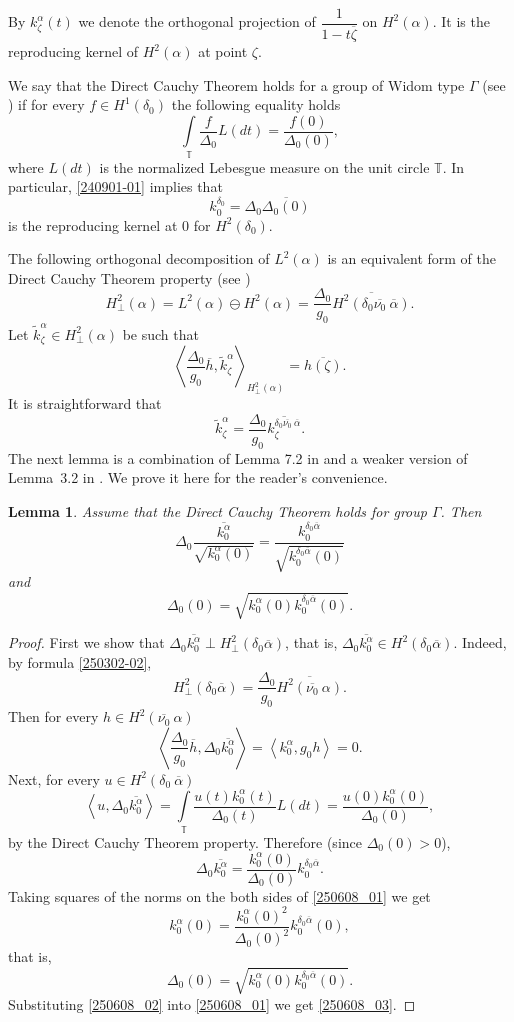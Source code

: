 \documentclass[reqno,11pt,centertags]{article}
\newcommand{\bbT}{{\mathbb{T}}}
\newcommand{\z}{\zeta}
\newtheorem{lemma}[theorem]{Lemma}
\theoremstyle{definition}
\def\be{\begin{equation}}
\def\ee{\end{equation}}
\def\a{\alpha}
\def\d{\delta}
\def\D{\Delta}
\def\G{\Gamma}
\def\z{\zeta}
\begin{document}
By $k^\a_\z(t)$ we denote the orthogonal projection of $\dfrac{1}{1-t\overline\z}$ on $H^2(\a)$. It is the reproducing kernel of $H^2(\a)$ at point $\z$.

We say that the Direct Cauchy Theorem holds for a group of Widom type $\G$
(see \cite{Hasu, SY})
if for every $f\in H^1(\d_0)$ the following equality holds
\be\label{240901-01}
\int\limits_{\mathbb T}\frac{f}{\D_0}L(dt)=\frac{f(0)}{\D_0(0)},
\ee
where $L(dt)$ is the normalized Lebesgue measure on the unit circle $\bbT$. In particular, \eqref{240901-01} implies
that
$$
k^{\d_0}_0=\D_0\overline{\D_0(0)}
$$
is the reproducing kernel at $0$ for $H^2(\d_0)$.

The following orthogonal decomposition of
$L^2(\a)$ is an equivalent form of the Direct Cauchy Theorem property
(see \cite{Hasu, SY})
\be\label{250302-02}
H^2_\perp(\alpha)=L^2(\alpha)\ominus H^2(\alpha)
=\frac{\Delta_0}{g_0}\overline{H^2(\delta_0\overline{\nu_0}\ \overline\alpha)}.
\ee
Let $\widetilde k^\alpha_\zeta\in H^2_\perp(\alpha)$ be such that
$$
\left\langle
\dfrac{\D_0}{g_0}\overline{h}, \widetilde k^\alpha_\zeta
\right\rangle_{H^2_\perp(\alpha)}=\overline{h(\zeta)}.
$$
It is straightforward that
\be\label{June22-01}
\widetilde k^\alpha_\zeta
=\dfrac{\Delta_0}{g_0}\overline{k^{\delta_0 \overline{\nu_0}\ \overline\alpha}_\zeta}
.
\ee
The next lemma is a combination of Lemma 7.2 in \cite{SY}
and a weaker version of Lemma~3.2 in \cite{VY}.
We prove it here for the reader's convenience.
\begin{lemma}\label{250607_01}
Assume that the Direct Cauchy Theorem holds for group $\G$. Then
\be\label{250608_03}
\D_0\dfrac{\overline{k^\alpha_0}}{\sqrt{k^\alpha_0(0)}}
 =
\dfrac{k^{\d_0\overline\a}_0}{\sqrt{k^{\d_0\overline\a}_0(0)}}
\ee
and
\be\label{250608_04}
\D_0(0)
=\sqrt{k^\alpha_0(0)k^{\d_0\overline\a}_0 (0)}.
\ee
\end{lemma}
\begin{proof}
First we show that
$\D_0\overline{k^{\a}_0}\perp H^2_\perp(\d_0\overline\alpha)$,
that is,
$\D_0\overline{k^{\a}_0}\in H^2(\d_0\overline\alpha)$. Indeed,
by formula \eqref{250302-02},
$$
H^2_\perp(\d_0\overline\alpha)
=\frac{\Delta_0}{g_0}\overline{H^2(\overline{\nu_0}\ \alpha)}.
$$
Then for every $h\in {H^2(\overline{\nu_0}\ \alpha)}$
$$
\left\langle
\dfrac{\D_0}{g_0}\overline{h}, \D_0\overline{k^\alpha_0}
\right\rangle
=
\left\langle
k^\alpha_0 , g_0 h
\right\rangle
=0.
$$
Next, for every $u\in {H^2(\d_0\ \overline\alpha)}$
$$
\left\langle
u, \D_0\overline{k^\alpha_0}
\right\rangle
=
\int\limits_{\bbT}\dfrac{u(t)k^\alpha_0(t)}{\D_0(t)}L(dt)
=
\dfrac{u(0)k^\alpha_0(0)}{\D_0(0)},
$$
by the Direct Cauchy Theorem property. Therefore (since $\D_0(0)>0$),
\be\label{250608_01}
\D_0\overline{k^\alpha_0}
 =
\dfrac{k^\alpha_0(0)}{\D_0(0)}k^{\d_0\overline\a}_0.
\ee
Taking squares of the norms on the both sides of \eqref{250608_01} we get
$$
k^\alpha_0(0)
 =
\dfrac{k^\alpha_0(0)^2}{\D_0(0)^2}k^{\d_0\overline\a}_0 (0),
$$
that is,
\be\label{250608_02}
\D_0(0)
=
\sqrt{k^\alpha_0(0)k^{\d_0\overline\a}_0 (0)}.
\ee
Substituting \eqref{250608_02} into \eqref{250608_01} we get \eqref{250608_03}.
\end{proof}
\end{document}
